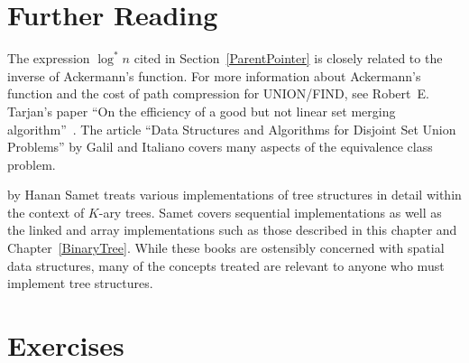 \section{Further Reading}
\label{GenFurtherRead}

The expression \(\log^* n\) cited
in Section~\ref{ParentPointer} is closely related to the inverse of
Ackermann's function.
For more information about Ackermann's function and the cost of path
compression for UNION/FIND, see Robert~E. Tarjan's paper
``On the efficiency of a good but not linear set merging
algorithm''~\cite{Tarjan}.
The article ``Data Structures and Algorithms for Disjoint Set Union
Problems'' by Galil and Italiano \cite{UFind} covers many aspects of the
equivalence class problem.

by Hanan Samet \cite{SametNew} treats various implementations of tree
structures in
detail within the context of \(K\)-ary trees.
Samet covers sequential implementations as well as the
linked and array implementations such as those described in this
chapter and Chapter~\ref{BinaryTree}.
While these books are ostensibly concerned with spatial data
structures, many of the concepts treated are relevant to
anyone who must implement tree structures.

\section{Exercises}

